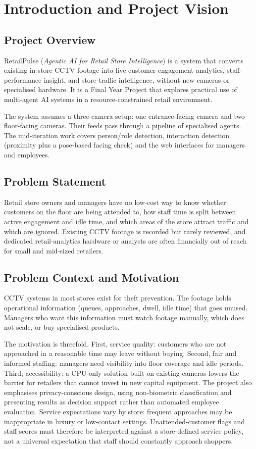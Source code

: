 \chapter{Introduction and Project Vision}
\label{ch:intro}
\section{Project Overview}
RetailPulse (\textit{Agentic AI for Retail Store Intelligence}) is a system that converts existing in-store CCTV footage into live customer-engagement analytics, staff-performance insight, and store-traffic intelligence, without new cameras or specialised hardware. It is a Final Year Project that explores practical use of multi-agent AI systems in a resource-constrained retail environment.

The system assumes a three-camera setup: one entrance-facing camera and two floor-facing cameras. Their feeds pass through a pipeline of specialised agents. The mid-iteration work covers person/role detection, interaction detection (proximity plus a pose-based facing check) and the web interfaces for managers and employees.

\section{Problem Statement}
Retail store owners and managers have no low-cost way to know whether customers on the floor are being attended to, how staff time is split between active engagement and idle time, and which areas of the store attract traffic and which are ignored. Existing CCTV footage is recorded but rarely reviewed, and dedicated retail-analytics hardware or analysts are often financially out of reach for small and mid-sized retailers.

\section{Problem Context and Motivation}
CCTV systems in most stores exist for theft prevention. The footage holds operational information (queues, approaches, dwell, idle time) that goes unused. Managers who want this information must watch footage manually, which does not scale, or buy specialised products.

The motivation is threefold. First, service quality: customers who are not approached in a reasonable time may leave without buying. Second, fair and informed staffing: managers need visibility into floor coverage and idle periods. Third, accessibility: a CPU-only solution built on existing cameras lowers the barrier for retailers that cannot invest in new capital equipment. The project also emphasises privacy-conscious design, using non-biometric classification and presenting results as decision support rather than automated employee evaluation. Service expectations vary by store: frequent approaches may be inappropriate in luxury or low-contact settings. Unattended-customer flags and staff scores must therefore be interpreted against a store-defined service policy, not a universal expectation that staff should constantly approach shoppers.

